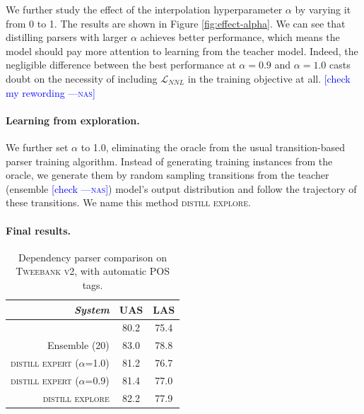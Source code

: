 \documentclass[11pt,a4paper]{article}
\newcommand{\nascomment}[1]{\textcolor{blue}{[#1 ---\textsc{nas}]}}
\begin{document}
We further study the effect of the interpolation hyperparameter $\alpha$ by varying it from 0 to 1.
The results are shown in Figure \ref{fig:effect-alpha}. We can see that distilling parsers with larger $\alpha$ achieves better
performance, which means the model should pay more attention to learning
from the teacher model.  Indeed, the negligible difference between the
best performance at $\alpha = 0.9$ and $\alpha=1.0$ casts doubt on the
necessity of including $\mathcal{L}_{NNL}$ in the training objective
at all. \nascomment{check my rewording}

\paragraph{Learning from exploration.} We further set $\alpha$ to 1.0,
eliminating the oracle from the usual transition-based parser
training algorithm.  Instead of generating
training instances from the oracle, we generate them by random sampling
transitions from the teacher (ensemble \nascomment{check}) model's output distribution and follow the
trajectory of these transitions. We name this method \textsc{distill explore}.

\paragraph{Final results.}
\begin{table}[t]
	\centering
	\begin{tabular}{rcc}
		\hline
		\it System & UAS & LAS \\
		\hline
		\newcite{ballesteros-EtAl:2016:EMNLP2016} & 80.2 & 75.4 \\
		Ensemble (20) & 83.0 & 78.8 \\
		\textsc{distill expert} ($\alpha$=1.0) & 81.2 & 76.7 \\
		\textsc{distill expert} ($\alpha$=0.9) & 81.4 & 77.0 \\		
		\textsc{distill explore} & 82.2 & 77.9 \\
		\hline
	\end{tabular}
	\caption{Dependency parser comparison on \textsc{Tweebank v2},
           with automatic POS tags. \label{tbl:parse-result}}
\end{table}
\end{document}

